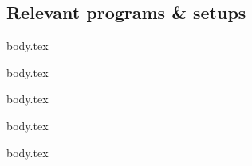 \subsection{Relevant programs \& setups}

\ifdefined\wslRelevantWindowsTerminal
{body.tex}
\fi

\ifdefined\wslRelevantVscode
{body.tex}
\fi

\ifdefined\wslRelevantDocker
{body.tex}
\fi

\ifdefined\wslPackages
{body.tex}
\fi

\ifdefined\wslExtras
{body.tex}
\fi